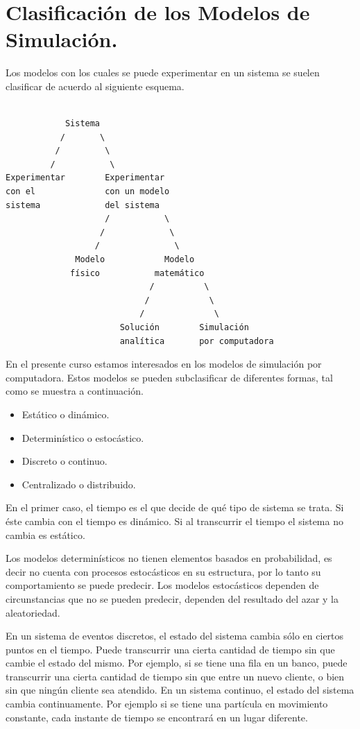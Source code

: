 \section{Clasificación de los Modelos de Simulación.}


Los modelos con los cuales se puede experimentar en un sistema se suelen clasificar de acuerdo al siguiente esquema.
\begin{verbatim}

            Sistema
           /       \
          /         \
         /           \
Experimentar        Experimentar
con el              con un modelo
sistema             del sistema
                    /           \
                   /             \
                  /               \
              Modelo            Modelo
             físico           matemático
                             /          \
                            /            \
                           /              \
                       Solución        Simulación
                       analítica       por computadora

\end{verbatim}

En el presente curso estamos interesados en los modelos de simulación por computadora. Estos modelos se pueden subclasificar de diferentes formas, tal como se muestra a continuación.
\begin{itemize}
\item Estático o dinámico.

\item Determinístico o estocástico.

\item Discreto o continuo.

\item Centralizado o distribuido.
\end{itemize}

En el primer caso, el tiempo es el que decide de qué tipo de sistema se trata. Si éste cambia con el tiempo es dinámico. Si al transcurrir el tiempo el sistema no cambia es estático.

Los modelos determinísticos no tienen elementos basados en probabilidad, es decir no cuenta con procesos estocásticos en su estructura, por lo tanto su comportamiento se puede predecir. Los modelos estocásticos dependen de circunstancias que no se pueden predecir, dependen del resultado del azar y la aleatoriedad.

En un sistema de eventos discretos, el estado del sistema cambia sólo en ciertos puntos en el tiempo. Puede transcurrir una cierta cantidad de tiempo sin que cambie el estado del mismo. Por ejemplo, si se tiene una fila en un banco, puede transcurrir una cierta cantidad de tiempo sin que entre un nuevo cliente, o bien sin que ningún cliente sea atendido. En un sistema continuo, el estado del sistema cambia continuamente. Por ejemplo si se tiene una partícula en movimiento constante, cada instante de tiempo se encontrará en un lugar diferente.

